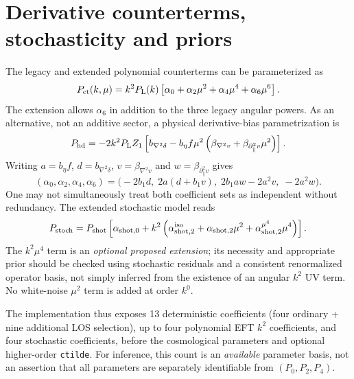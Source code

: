 \documentclass[11pt,a4paper]{article}
\newcommand{\Pl}{P_{\rm L}}
\begin{document}
\section{Derivative counterterms, stochasticity and priors}\label{sec:eft}
The legacy and extended polynomial counterterms can be parameterized as
\begin{equation}\label{eq:ct}
 P_{\rm ct}(k,\mu)=k^2\Pl(k)\left[\alpha_0+\alpha_2\mu^2+\alpha_4\mu^4+\alpha_6\mu^6\right].
\end{equation}
The extension allows $\alpha_6$ in addition to the three legacy angular powers. As an alternative, not an additive sector, a physical derivative-bias parametrization is
\begin{equation}\label{eq:physical}
 P_{\rm hd}=-2k^2\Pl Z_1\left[b_{\nabla^2\delta}-b_\eta f\mu^2\left(\beta_{\nabla^2v}+\beta_{\partial_\parallel^2v}\mu^2\right)\right].
\end{equation}
Writing $a=b_\eta f$, $d=b_{\nabla^2\delta}$, $v=\beta_{\nabla^2v}$ and $w=\beta_{\partial_\parallel^2v}$ gives
\begin{equation}
 (\alpha_0,\alpha_2,\alpha_4,\alpha_6)=\big(-2b_1d,\;2a(d+b_1v),\;2b_1aw-2a^2v,\;-2a^2w\big).
\end{equation}
One may not simultaneously treat both coefficient sets as independent without redundancy.
The extended stochastic model reads
\begin{equation}\label{eq:stoch}
 P_{\rm stoch}=P_{\rm shot}\left[\alpha_{\rm shot,0}
 +k^2\left(\alpha_{\rm shot,2}^{\rm iso}
 +\alpha_{\rm shot,2}\mu^2+\alpha_{\rm shot,2}^{\mu^4}\mu^4\right)\right].
\end{equation}
The $k^2\mu^4$ term is an \emph{optional proposed extension}; its necessity and appropriate prior should be checked using stochastic residuals and a consistent renormalized operator basis, not simply inferred from the existence of an angular $k^2$ UV term. No white-noise $\mu^2$ term is added at order $k^0$.

The implementation thus exposes 13 deterministic coefficients (four ordinary + nine additional LOS selection), up to four polynomial EFT $k^2$ coefficients, and four stochastic coefficients, before the cosmological parameters and optional higher-order \texttt{ctilde}. For inference, this count is an \emph{available} parameter basis, not an assertion that all parameters are separately identifiable from $(P_0,P_2,P_4)$.
\end{document}
